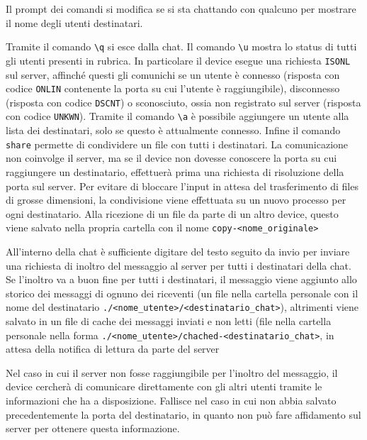 \documentclass[11pt,a4paper,twocolumn,twoside]{paper}
\begin{document}
    Il prompt dei comandi si modifica se si sta chattando con qualcuno
    per mostrare il nome degli utenti destinatari.

    Tramite il comando \texttt{\textbackslash{}q} si esce dalla chat. Il
    comando \texttt{\textbackslash{}u} mostra lo status di tutti gli
    utenti presenti in rubrica. In particolare il device esegue una
    richiesta \texttt{ISONL} sul server, affinché questi gli comunichi
    se un utente è connesso (risposta con codice \texttt{ONLIN}
    contenente la porta su cui l'utente è raggiungibile), disconnesso
    (risposta con codice \texttt{DSCNT}) o sconosciuto, ossia non
    registrato sul server (risposta con codice \texttt{UNKWN}). Tramite
    il comando \texttt{\textbackslash{}a} è possibile aggiungere un
    utente alla lista dei destinatari, solo se questo è attualmente
    connesso. Infine il comando \texttt{share} permette di condividere
    un file con tutti i destinatari. La comunicazione non coinvolge il
    server, ma se il device non dovesse conoscere la porta su cui
    raggiungere un destinatario, effettuerà prima una richiesta di
    risoluzione della porta sul server. Per evitare di bloccare l'input
    in attesa del trasferimento di files di grosse dimensioni, la
    condivisione viene effettuata su un nuovo processo per ogni
    destinatario. Alla ricezione di un file da parte di un altro device,
    questo viene salvato nella propria cartella con il nome
    \texttt{copy-\textless{}nome\_originale\textgreater{}}

    All'interno della chat è sufficiente digitare del testo seguito da
    invio per inviare una richiesta di inoltro del messaggio al server
    per tutti i destinatari della chat. Se l'inoltro va a buon fine per
    tutti i destinatari, il messaggio viene aggiunto allo storico dei
    messaggi di ognuno dei riceventi (un file nella cartella personale
    con il nome del destinatario
    \texttt{./\textless{}nome\_utente\textgreater{}/\textless{}destinatario\_chat\textgreater{}}),
    altrimenti viene salvato in un file di cache dei messaggi inviati e
    non letti (file nella cartella personale nella forma
    \texttt{./\textless{}nome\_utente\textgreater{}/chached-\textless{}destinatario\_chat\textgreater{}},
    in attesa della notifica di lettura da parte del server

    Nel caso in cui il server non fosse raggiungibile per l'inoltro del
    messaggio, il device cercherà di comunicare direttamente con gli altri
    utenti tramite le informazioni che ha a disposizione. Fallisce nel
    caso in cui non abbia salvato precedentemente la porta del destinatario, 
    in quanto non può fare affidamento sul server per ottenere questa informazione.
\end{document}
